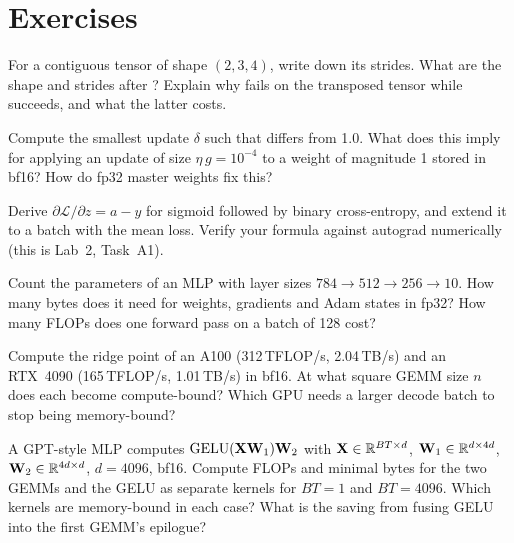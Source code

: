 \section{Exercises}\label{sec:pytorch:exercises}

\begin{exercise}[Strides]
For a contiguous tensor of shape $(2,3,4)$, write down its strides. What are the shape and strides after
? Explain why  fails on the transposed tensor while
 succeeds, and what the latter costs.
\end{exercise}

\begin{exercise}[bf16 rounding]
Compute the smallest update $\delta$ such that  differs
from 1.0. What does this imply for applying an update of size $\eta\, g = 10^{-4}$ to a weight of magnitude 1
stored in bf16? How do fp32 master weights fix this?
\end{exercise}

\begin{exercise}
Derive $\partial\mathcal{L}/\partial z = a-y$ for sigmoid followed by binary cross-entropy, and extend it to
a batch with the mean loss. Verify your formula against autograd numerically (this is Lab~2, Task~A1).
\end{exercise}

\begin{exercise}
Count the parameters of an MLP with layer sizes $784\to512\to256\to10$. How many bytes does it need for
weights, gradients and Adam states in fp32? How many FLOPs does one forward pass on a batch of 128 cost?
\end{exercise}

\begin{exercise}
Compute the ridge point of an A100 (312\,TFLOP/s, 2.04\,TB/s) and an RTX~4090 (165\,TFLOP/s, 1.01\,TB/s) in bf16.
At what square GEMM size $n$ does each become compute-bound? Which GPU needs a larger decode batch to stop
being memory-bound?
\end{exercise}

\begin{exercise}
A GPT-style MLP computes $\operatorname{GELU}(\mathbf{X}\mathbf{W}_1)\mathbf{W}_2$ with $\mathbf{X}\in\mathbb{R}^{BT\times d}$,
$\mathbf{W}_1\in\mathbb{R}^{d\times4d}$, $\mathbf{W}_2\in\mathbb{R}^{4d\times d}$, $d=4096$, bf16. Compute FLOPs and minimal bytes for the
two GEMMs and the GELU as separate kernels for $BT=1$ and $BT=4096$. Which kernels are memory-bound in each
case? What is the saving from fusing GELU into the first GEMM's epilogue?
\end{exercise}

